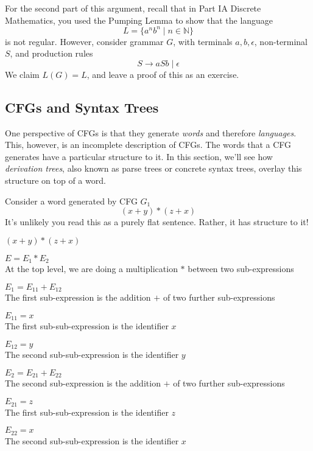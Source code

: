 For the second part of this argument, recall that in \textsf{Part IA Discrete Mathematics}, you used the Pumping Lemma to show that the language
\[ L = \{ a^nb^n \mid n \in \mathbb{N}\}\]
is not regular. However, consider grammar $G$, with terminals $a, b, \epsilon$, non-terminal $S$, and production rules
\[S \rightarrow aSb \mid \epsilon \]
We claim $L(G) = L$, and leave a proof of this as an exercise.


\subsection{CFGs and Syntax Trees}\label{section:cfg-syntaxtrees}
One perspective of CFGs is that they generate \textit{words} and therefore \textit{languages}. This, however, is an incomplete description of CFGs. The words that a CFG generates have a particular structure to it. In this section, we'll see how \textit{derivation trees}, also known as parse trees or concrete syntax trees, overlay this structure on top of a word.

Consider a word generated by CFG $G_1$
\[(x + y) * (z + x)\]
It's unlikely you read this as a purely flat sentence. Rather, it has structure to it!

$(x + y) * (z + x)$

\begin{tcbleftbar}
$E = E_1 * E_2$\\
At the top level, we are doing a multiplication $*$ between two sub-expressions
\vspace{3mm}
\begin{tcbleftbar}
$E_1 = E_{11} + E_{12}$\\
The first sub-expression is the addition $+$ of two further sub-expressions
\vspace{3mm}
\begin{tcbleftbar}
$E_{11} = x$\\
The first sub-sub-expression is the identifier $x$
\end{tcbleftbar}
\begin{tcbleftbar}
$E_{12} = y$\\
The second sub-sub-expression is the identifier $y$
\end{tcbleftbar}
\end{tcbleftbar}
\begin{tcbleftbar}
$E_2 = E_{21} + E_{22}$\\
The second sub-expression is the addition $+$ of two further sub-expressions
\vspace{3mm}
\begin{tcbleftbar}
$E_{21} = z$\\
The first sub-sub-expression is the identifier $z$
\end{tcbleftbar}
\begin{tcbleftbar}
$E_{22} = x$\\
The second sub-sub-expression is the identifier $x$
\end{tcbleftbar}
\end{tcbleftbar}
\end{tcbleftbar}

